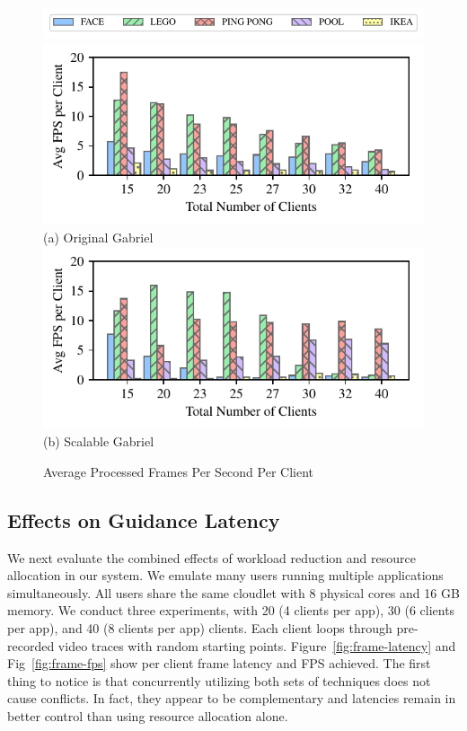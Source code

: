 \begin{figure}[]
  \begin{center}
    \includegraphics[width=.9\linewidth]{FIGS/fig-alloc-latency-legend.pdf}
    \includegraphics[width=\linewidth]{FIGS/fig-alloc-fps-baseline.pdf}
    {(a) Original Gabriel}
    \includegraphics[width=\linewidth]{FIGS/fig-alloc-fps-cpushares.pdf}
    {(b) Scalable Gabriel}
  \end{center}
  \caption{Average Processed Frames Per Second Per Client}
  \label{fig:alloc-fps}
\end{figure}


\subsection{Effects on Guidance Latency}

We next evaluate the combined effects of workload reduction and
resource allocation in our system. We emulate many users running
multiple applications simultaneously. All users share the same
cloudlet with 8 physical cores and 16 GB memory. We conduct three experiments,
with 20 (4 clients per app), 30 (6 clients per app), and 40 (8 clients
per app) clients. Each client loops through pre-recorded video traces
with random starting points.  Figure~\ref{fig:frame-latency} and
Fig~\ref{fig:frame-fps} show per client frame latency and FPS
achieved. The first thing to notice is that concurrently utilizing
both sets of techniques does not cause conflicts. In fact, they appear
to be complementary and latencies remain in better control than using
resource allocation alone.

